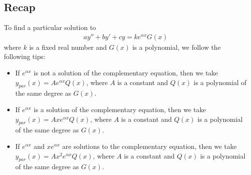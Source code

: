 \documentclass[12pt,a4paper]{article}
\begin{document}
\newpage

\subsection{Recap}
To find a particular solution to
	\begin{align*}
	ay'' + by' + cy = k e^{\alpha x} G(x)
	\end{align*}
where $k$ is a fixed real number and $G(x)$ is a polynomial, we follow the following tips:
	\begin{itemize}
	\item If $e^{\alpha x}$ is not a solution of the complementary equation, then we take $y_{par} (x) = A e^{\alpha x} Q(x)$, where $A$ is a constant and $Q(x)$ is a polynomial of the same degree as $G(x)$.
	\item If $e^{\alpha x}$ is a solution of the complementary equation, then we take $y_{par} (x) = Axe^{\alpha x} Q(x)$, where $A$ is a constant and $Q(x)$ is a polynomial of the same degree as $G(x)$.
	\item If $e^{\alpha x}$ and $xe^{\alpha x}$ are solutions to the complementary equation, then we take $y_{par} (x) = Ax^2 e^{\alpha x} Q(x)$, where $A$ is a constant and $Q(x)$ is a polynomial of the same degree as $G(x)$.
	\end{itemize}
\end{document}
